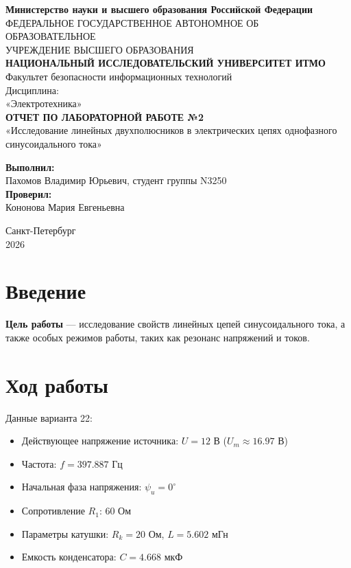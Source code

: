\documentclass[a4paper,12pt]{article}
\begin{document}
\begin{titlepage}
    \centering
    \textbf{Министерство науки и высшего образования Российской Федерации}\\
    ФЕДЕРАЛЬНОЕ ГОСУДАРСТВЕННОЕ АВТОНОМНОЕ ОБ ОБРАЗОВАТЕЛЬНОЕ\\
    УЧРЕЖДЕНИЕ ВЫСШЕГО ОБРАЗОВАНИЯ\\
    \textbf{НАЦИОНАЛЬНЫЙ ИССЛЕДОВАТЕЛЬСКИЙ УНИВЕРСИТЕТ ИТМО}\\
    \vspace{1cm}
    Факультет безопасности информационных технологий\\
    \vspace{2cm}
    Дисциплина:\\
    «Электротехника»\\
    \vspace{2cm}
    \textbf{ОТЧЕТ ПО ЛАБОРАТОРНОЙ РАБОТЕ №2}\\
    «Исследование линейных двухполюсников в электрических цепях однофазного синусоидального тока»\\
    \vspace{3cm}
    \begin{flushright}
        \textbf{Выполнил:}\\
        Пахомов Владимир Юрьевич, студент группы N3250\\
        \vspace{0.5cm}
        \textbf{Проверил:}\\
        Кононова Мария Евгеньевна\\
    \end{flushright}
    \vfill
    Санкт-Петербург\\
    2026
\end{titlepage}

\tableofcontents
\newpage

\section{Введение}
\textbf{Цель работы} — исследование свойств линейных цепей синусоидального тока, а также особых режимов работы, таких как резонанс напряжений и токов.

\section{Ход работы}

Данные варианта 22:
\begin{itemize}
    \item Действующее напряжение источника: $U = 12$ В ($U_m \approx 16.97$ В)
    \item Частота: $f = 397.887$ Гц
    \item Начальная фаза напряжения: $\psi_u = 0^\circ$
    \item Сопротивление $R_1$: 60 Ом
    \item Параметры катушки: $R_k = 20$ Ом, $L = 5.602$ мГн
    \item Емкость конденсатора: $C = 4.668$ мкФ
\end{itemize}
\end{document}
